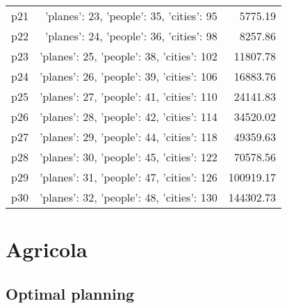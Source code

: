 \documentclass{article}
\begin{document}
\begin{center}
\begin{tabular}{@{}l|r|r@{}}
  p21&{'planes': 23, 'people': 35, 'cities': 95}&5775.19\\
  p22&{'planes': 24, 'people': 36, 'cities': 98}&8257.86\\
  p23&{'planes': 25, 'people': 38, 'cities': 102}&11807.78\\
  p24&{'planes': 26, 'people': 39, 'cities': 106}&16883.76\\
  p25&{'planes': 27, 'people': 41, 'cities': 110}&24141.83\\
  p26&{'planes': 28, 'people': 42, 'cities': 114}&34520.02\\
  p27&{'planes': 29, 'people': 44, 'cities': 118}&49359.63\\
  p28&{'planes': 30, 'people': 45, 'cities': 122}&70578.56\\
  p29&{'planes': 31, 'people': 47, 'cities': 126}&100919.17\\
  p30&{'planes': 32, 'people': 48, 'cities': 130}&144302.73
                            \end{tabular}
                            \end{center}
                    
                            \newpage \section{Agricola}
                    \subsection*{Optimal planning}
                    
\end{document}
